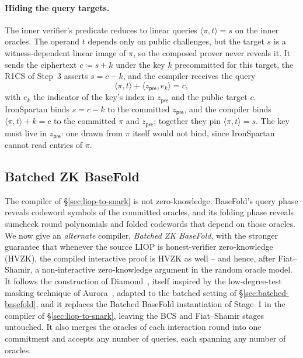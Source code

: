 \documentclass{article}
\theoremstyle{definition}
\begin{document}
\paragraph{Hiding the query targets.}
The inner verifier's predicate reduces to linear queries $\langle \pi, t \rangle = s$ on the inner oracles. The operand $t$ depends only on public challenges, but the target $s$ is a witness-dependent linear image of $\pi$, so the composed prover never reveals it. It sends the ciphertext $c \coloneqq s + k$ under the key $k$ precommitted for this target, the R1CS of Step~3 asserts $s = c - k$, and the compiler receives the query
\begin{equation}
  \langle \pi, t \rangle + \langle z_{\textsf{pre}}, e_k \rangle = c,
  \label{eq:target-relation}
\end{equation}
with $e_k$ the indicator of the key's index in $z_{\textsf{pre}}$ and the public target $c$. IronSpartan binds $s = c - k$ to the committed $z_{\textsf{pre}}$, and the compiler binds $\langle \pi, t \rangle + k = c$ to the committed $\pi$ and $z_{\textsf{pre}}$; together they pin $\langle \pi, t \rangle = s$. The key must live in $z_{\textsf{pre}}$: one drawn from $\pi$ itself would not bind, since IronSpartan cannot read entries of $\pi$.

\subsection{Batched ZK BaseFold}
\label{sec:batched-zk-basefold}

The compiler of \S\ref{sec:liop-to-snark} is not zero-knowledge: BaseFold's query phase reveals codeword symbols of the committed oracles, and its folding phase reveals sumcheck round polynomials and folded codewords that depend on those oracles. We now give an \emph{alternate} compiler, \emph{Batched ZK BaseFold}, with the stronger guarantee that whenever the source LIOP is honest-verifier zero-knowledge (HVZK), the compiled interactive proof is HVZK as well -- and hence, after Fiat--Shamir, a non-interactive zero-knowledge argument in the random oracle model. It follows the construction of Diamond~\cite{Diamond:2025ac}, itself inspired by the low-degree-test masking technique of Aurora~\cite{Ben-Sasson:2019ab}, adapted to the batched setting of \S\ref{sec:batched-basefold}, and it replaces the Batched BaseFold instantiation of Stage~1 in the compiler of \S\ref{sec:liop-to-snark}, leaving the BCS and Fiat--Shamir stages untouched. It also merges the oracles of each interaction round into one commitment and accepts any number of queries, each spanning any number of oracles.
\end{document}
